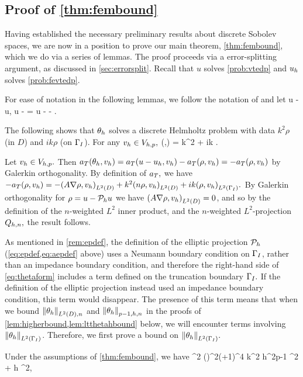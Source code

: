 \subsection{Proof of \cref{thm:fembound}}\label{sec:fembound}

Having established the necessary preliminary results about discrete Sobolev spaces, we are now in a position to prove our main theorem, \cref{thm:fembound}, which we do via a series of lemmas. The proof proceeds via a error-splitting argument, as discussed in \cref{sec:errorsplit}. Recall that $u$ solves \cref{prob:vtedp} and $u_{h}$ solves \cref{prob:fevtedp}.

For ease of notation in the following lemmas, we follow the notation of \cite{DuWu:15} and let 
\beqs
\rho \de u - \Ph u, \tand
\eeqs
\beqs
\thetah \de \Ph u - \uh = u - \uh - \rho.
\eeqs


The following  shows that $\theta_{h}$ solves a discrete Helmholtz problem with data $k^2 \rho$ (in $D$) and $ik \rho$ (on $\Gamma_{I}$).
\label{lem:simpleform}
For any $v_{h} \in V_{h,p},$
\beq\label{eq:thetaform}
\aT(\thetah,\vh) = k^2\IPLtDn{\Qhn\rho}{\vh} + ik \IPLtGI{\rho}{\vh}.
\eeq
\ele

Let $v_{h} \in V_{h,p}.$ Then $a_{T}(\theta_{h},v_{h}) = a_{T}(u-u_{h},v_{h}) - a_{T}(\rho,v_{h}) = -a_{T}(\rho,v_{h})$ by Galerkin orthogonality. By definition of $a_{T},$ we have $-\aT(\rho,\vh) = -\IPLtD{A\grad\rho}{\vh} + k^2 \IPLtD{n\rho}{\vh} + ik\IPLtGI{\rho}{\vh}.$ By Galerkin orthogonality for $\rho = u - \mathcal P_{h} u$ we have $\IPLtD{A\grad\rho}{\vh} = 0$, and so by the definition of the $n$-weighted $L^2$ inner product, and the $n$-weighted $L^2$-projection $Q_{h,n},$ the result follows.
\epf

As mentioned in \cref{rem:epdef}, the definition of the elliptic projection $\mathcal P_{h}$ (\cref{eq:epdef,eq:aepdef} above) uses a Neumann boundary condition on $\Gamma_{I}$, rather than an impedance boundary condition, and therefore the right-hand side of \cref{eq:thetaform} includes a term defined on the truncation boundary $\Gamma_{I}.$ If the definition of the elliptic projection instead used an impedance boundary condition, this term would disappear. The presence of this term means that when we bound $\NLtDn{\thetah}$ and $\Npmohn{\thetah}$ in the proofs of \cref{lem:higherbound,lem:ltthetahbound} below, we will encounter terms involving $\NLtGI{\thetah}$. Therefore, we first prove a bound on $\NLtGI{\thetah}.$

\label{lem:boundarybound}
Under the assumptions of \cref{thm:fembound}, we have
\beq\label{eq:boundarybound}
\NLtGI{\thetah}^2 \leq \Cboundaryo \mleft(\En\nvar\mright)^{2\mleft(+1\mright)}\nmax^4 k^2 h^{2p-1} ^2 + \Cboundaryt h \NHokD{\rho}^2,
\eeq
\ele

